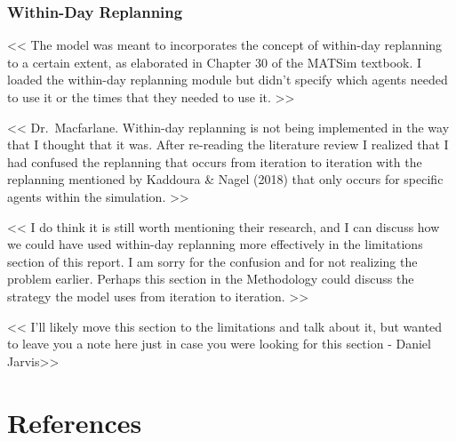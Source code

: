 \documentclass[fancy, oneside, mastersfancy, ms]{byuthesis}
\begin{document}
\hypertarget{within-day-replanning}{%
\subsection{Within-Day Replanning}\label{within-day-replanning}}

\textless\textless{} The model was meant to incorporates the concept of
within-day replanning to a certain extent, as elaborated in Chapter 30
of the MATSim textbook. I loaded the within-day replanning module but
didn't specify which agents needed to use it or the times that they
needed to use it. \textgreater\textgreater{}

\textless\textless{} Dr.~Macfarlane. Within-day replanning is not being
implemented in the way that I thought that it was. After re-reading the
literature review I realized that I had confused the replanning that
occurs from iteration to iteration with the replanning mentioned by
Kaddoura \& Nagel (2018) that only occurs for specific agents within the
simulation. \textgreater\textgreater{}

\textless\textless{} I do think it is still worth mentioning their
research, and I can discuss how we could have used within-day replanning
more effectively in the limitations section of this report. I am sorry
for the confusion and for not realizing the problem earlier. Perhaps
this section in the Methodology could discuss the strategy the model
uses from iteration to iteration. \textgreater\textgreater{}

\textless\textless{} I'll likely move this section to the limitations
and talk about it, but wanted to leave you a note here just in case you
were looking for this section - Daniel Jarvis\textgreater\textgreater{}


\hypertarget{references}{%
\chapter*{References}\label{references}}

\end{document}
